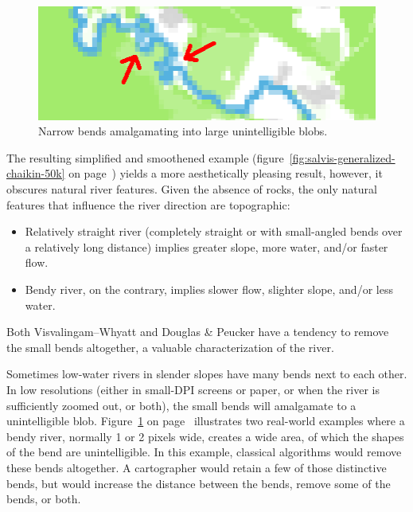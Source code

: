 \documentclass[a4paper]{article}
\newcommand{\onpage}[1]{\ref{#1} on page~\pageref{#1}}
\newcommand{\DP}{Douglas \& Peucker}
\newcommand{\VW}{Visvalingam--Whyatt}
\begin{document}
\begin{figure}[b!]
    \centering
    \includegraphics[width=.9\textwidth]{amalgamate1}
    \caption{Narrow bends amalgamating into large unintelligible blobs.}
    \label{fig:pixel-amalgamation}
\end{figure}

The resulting simplified and smoothened example
(figure~\onpage{fig:salvis-generalized-chaikin-50k}) yields a more
aesthetically pleasing result, however, it obscures natural river features.
Given the absence of rocks, the only natural features that influence the river
direction are topographic:

\begin{itemize}

    \item Relatively straight river (completely straight or with small-angled
        bends over a relatively long distance) implies greater slope, more
        water, and/or faster flow.

    \item Bendy river, on the contrary, implies slower flow, slighter slope,
        and/or less water.

\end{itemize}

Both {\VW} and {\DP} have a tendency to remove the small bends altogether, a
valuable characterization of the river.

Sometimes low-water rivers in slender slopes have many bends next to each
other. In low resolutions (either in small-DPI screens or paper, or when the
river is sufficiently zoomed out, or both), the small bends will amalgamate to
a unintelligible blob. Figure~\onpage{fig:pixel-amalgamation} illustrates two
real-world examples where a bendy river, normally 1 or 2 pixels wide, creates a
wide area, of which the shapes of the bend are unintelligible. In this example,
classical algorithms would remove these bends altogether. A cartographer would
retain a few of those distinctive bends, but would increase the distance
between the bends, remove some of the bends, or both.
\end{document}
